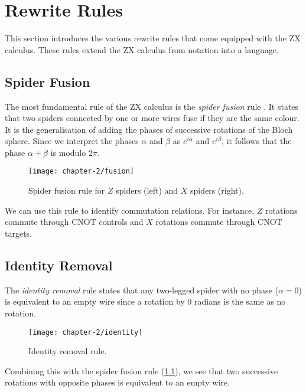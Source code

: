 \section{Rewrite Rules}

This section introduces the various rewrite rules that come equipped with the ZX calculus. These rules extend the ZX calculus from notation into a language.

\subsection{Spider Fusion}%
\label{spider-fusion}
The most fundamental rule of the ZX calculus is the \textit{spider fusion} rule \cite{Wetering2020}. It states that two spiders connected by one or more wires fuse if they are the same colour. It is the generalisation of adding the phases of successive rotations of the Bloch sphere. Since we interpret the phases $\alpha$ and $\beta$ as $e^{i\alpha}$ and $e^{i\beta}$, it follows that the phase $\alpha + \beta$ is modulo $2\pi$.

\begin{figure}[H]
    \centering
    \texttt{[image: chapter-2/fusion]}
    \caption{Spider fusion rule for $Z$ spiders (left) and $X$ spiders (right).}
\end{figure}

We can use this rule to identify commutation relations. For instance, $Z$ rotations commute through CNOT controls and $X$ rotations commute through CNOT targets.


\subsection{Identity Removal}%
\label{identity}
The \textit{identity removal} rule states that any two-legged spider with no phase ($\alpha = 0$) is equivalent to an empty wire since a rotation by 0 radians is the same as no rotation.
\begin{figure}[H]
    \centering
    \texttt{[image: chapter-2/identity]}
    \caption{Identity removal rule.}
\end{figure}

Combining this with the spider fusion rule (\ref{spider-fusion}), we see that two successive rotations with opposite phases is equivalent to an empty wire.


